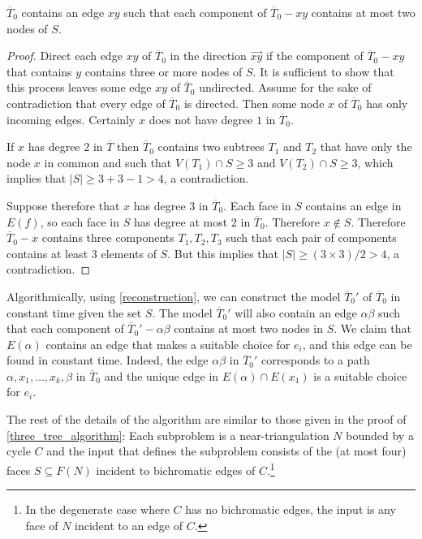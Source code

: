 \documentclass[a4paper,UKenglish,autoref]{lipics-v2021}
\begin{document}
\begin{clm}\label{director}
  $\overline{T}_0$ contains an edge $xy$ such that each component of $\overline{T}_0-xy$ contains at most two nodes of $S$.
\end{clm}

\begin{proof}
  Direct each edge $xy$ of $\overline{T}_0$ in the direction $\overrightarrow{xy}$ if the component of $\overline{T}_0-xy$ that contains $y$ contains three or more nodes of $S$.  It is sufficient to show that this process leaves some edge $xy$ of $\overline{T}_0$ undirected.  Assume for the sake of contradiction that every edge of $\overline{T}_0$ is directed.  Then some node $x$ of $\overline{T}_0$ has only incoming edges. Certainly $x$ does not have degree $1$ in $\overline{T}_0$.

  If $x$ has degree $2$ in $\overline{T}$ then $\overline{T}_0$ contains two subtrees $T_1$ and $T_2$ that have only the node $x$ in common and such that $V(T_1)\cap S\ge 3$ and $V(T_2)\cap S\ge 3$, which implies that $|S|\ge 3+3-1 > 4$, a contradiction.

  Suppose therefore that $x$ has degree $3$ in $\overline{T}_0$.  Each face in $S$ contains an edge in $E(f)$, so each face in $S$ has degree at most $2$ in $\overline{T}_0$.  Therefore $x\not\in S$.  Therefore $\overline{T}_0-x$ contains three components $T_1, T_2, T_3$ such that each pair of components contains at least $3$ elements of $S$.  But this implies that $|S|\ge (3\times 3)/2>4$, a contradiction.
\end{proof}



Algorithmically, using \cref{reconstruction}, we can construct the model $\overline{T}_0'$ of $\overline{T}_0$ in constant time given the set $S$.  The model $\overline{T}_0'$ will also contain an edge $\alpha\beta$ such that each component of $\overline{T}_0'-\alpha\beta$ contains at most two nodes in $S$. We claim that $E(\alpha)$  contains an edge that makes a suitable choice for $e_i$, and this edge can be found in constant time.  Indeed, the edge $\alpha\beta$ in  $\overline{T}_0'$ corresponds to a path $\alpha,x_1,\ldots,x_k,\beta$ in $\overline{T}_0$ and the unique edge in $E(\alpha)\cap E(x_1)$ is a suitable choice for $e_i$.  

The rest of the details of the algorithm are similar to those given in the proof of \cref{three_tree_algorithm}:  Each subproblem is a near-triangulation $N$ bounded by a cycle $C$ and the input that defines the subproblem consists of the (at most four) faces $S\subseteq F(N)$ incident to bichromatic edges of $C$.\footnote{In the degenerate case where $C$ has no bichromatic edges, the input is any face of $N$ incident to an edge of $C$.}
\end{document}
